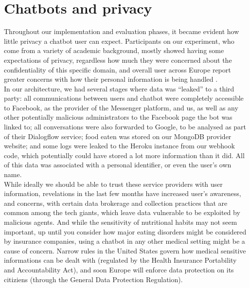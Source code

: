 \section{Chatbots and privacy}
Throughout our implementation and evaluation phases, it became evident how little privacy a chatbot user can expect. Participants on our experiment, who come from a variety of academic background, mostly showed having some expectations of privacy, regardless how much they were concerned about the confidentiality of this specific domain, and overall user across Europe report greater concerns with how their personal information is being handled \cite{europasurvey}. \\
In our architecture, we had several stages where data was ``leaked'' to a third party: all communications between users and chatbot were completely accessible to Facebook, as the provider of the Messenger platform, and us, as well as any other potentially malicious administrators to the Facebook page the bot was linked to; all conversations were also forwarded to Google, to be analysed as part of their Dialogflow service; food eaten was stored on our MongoDB provider website; and some logs were leaked to the Heroku instance from our webhook code, which potentially could have stored a lot more information than it did. All of this data was associated with a personal identifier, or even the user's own name. \\
While ideally we should be able to trust these service providers with user information, revelations in the last few months have increased user's awareness, and concerns, with certain data brokerage and collection practices that are common among the tech giants, which leave data vulnerable to be exploited by malicious agents. And while the sensitivity of nutritional habits may not seem important, up until you consider how major eating disorders might be considered by insurance companies, using a chatbot in any other medical setting might be a cause of concern. Narrow rules in the United States govern how medical sensitive informations can be dealt with (regulated by the Health Insurance Portability and Accountability Act), and soon Europe will enforce data protection on its citiziens (through the General Data Protection Regulation). \\
